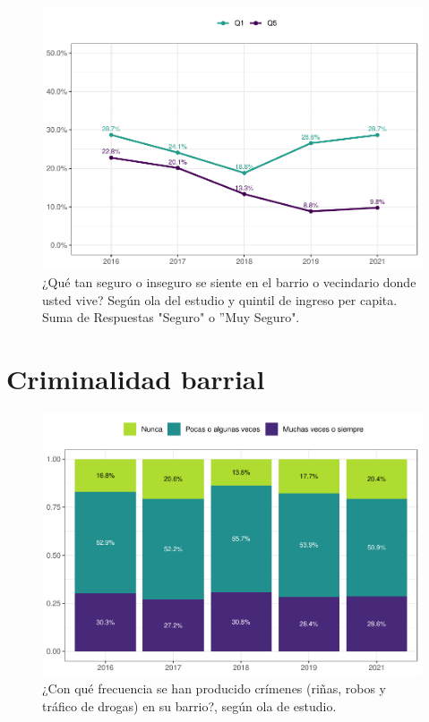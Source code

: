 \documentclass[
  12pt,
  openany]{book}
\begin{document}
\begin{figure}

{\centering \includegraphics{reporte-elsoc_files/figure-latex/seguri-quintil-1} 

}

\caption{¿Qué tan seguro o inseguro se siente en el barrio o vecindario donde usted vive? Según ola del estudio y quintil de ingreso per capita. Suma de Respuestas "Seguro" o ”Muy Seguro".}\label{fig:seguri-quintil}
\end{figure}

\hypertarget{criminalidad-barrial}{%
\section{Criminalidad barrial}\label{criminalidad-barrial}}

\begin{figure}

{\centering \includegraphics{reporte-elsoc_files/figure-latex/crim-olas-1} 

}

\caption{¿Con qué frecuencia se han producido crímenes (riñas, robos y tráfico de drogas) en su barrio?, según ola de estudio.}\label{fig:crim-olas}
\end{figure}
\end{document}
